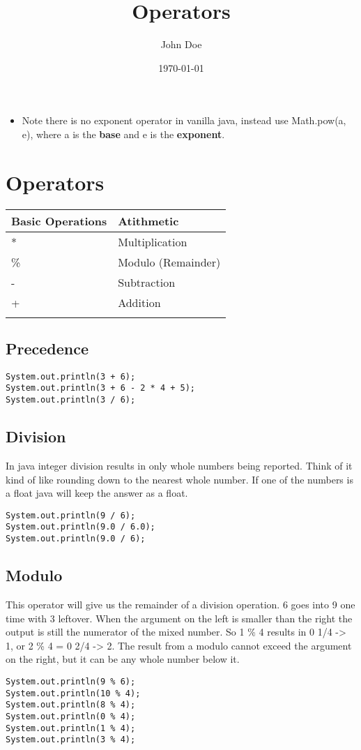\documentclass[11pt]{article}
\author{John Doe}
\date{\today}
\title{Operators}
\begin{document}
\maketitle
\tableofcontents

\begin{itemize}
\item Note there is no exponent operator in vanilla java, instead use Math.pow(a, e), where a is the \textbf{base} and e is the \textbf{exponent}.
\end{itemize}
\section{Operators}
\label{sec:orgafed8e2}
\begin{center}
\begin{tabular}{ll}
Basic Operations & Atithmetic\\
\hline
* & Multiplication\\
\% & Modulo (Remainder)\\
- & Subtraction\\
+ & Addition\\
 & \\
\end{tabular}
\end{center}

\subsection{Precedence}
\label{sec:org4999be3}
\begin{verbatim}
System.out.println(3 + 6);
System.out.println(3 + 6 - 2 * 4 + 5);
System.out.println(3 / 6);
\end{verbatim}

\subsection{Division}
\label{sec:org22c5243}
In java integer division results in only whole numbers being reported. Think of it kind of like rounding down to the nearest whole number. If one of the numbers is a float java will keep the answer as a float.
\begin{verbatim}
System.out.println(9 / 6);
System.out.println(9.0 / 6.0);
System.out.println(9.0 / 6);

\end{verbatim}
\subsection{Modulo}
\label{sec:orgc18d412}
This operator will give us the remainder of a division operation. 6 goes into 9 one time with 3 leftover. When the argument on the left is smaller than the right the output is still the numerator of the mixed number. So 1 \% 4 results in 0 1/4 -> 1, or 2 \% 4 = 0 2/4 -> 2. The result from a modulo cannot exceed the argument on the right, but it can be any whole number below it. 
\begin{verbatim}
System.out.println(9 % 6);
System.out.println(10 % 4);
System.out.println(8 % 4);
System.out.println(0 % 4);
System.out.println(1 % 4);
System.out.println(3 % 4);
\end{verbatim}
\end{document}
